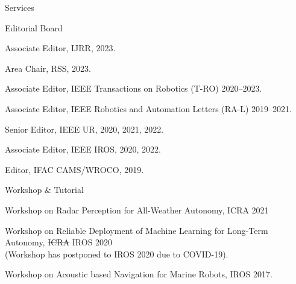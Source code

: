 \begin{rSection}{Services}
\begin{rSubsection}{Editorial Board}{}{}{}
  \item Associate Editor, IJRR, 2023.
  \item Area Chair, RSS, 2023.
  \item Associate Editor, IEEE Transactions on Robotics (T-RO) 2020--2023.
  \item Associate Editor, IEEE Robotics and Automation Letters (RA-L) 2019--2021.
  \item Senior Editor, IEEE UR, 2020, 2021, 2022.
  \item Associate Editor, IEEE IROS, 2020, 2022.
  \item Editor, IFAC CAMS/WROCO, 2019.
\end{rSubsection}

\begin{rSubsection}{Workshop \& Tutorial}{}{}{}
  \item Workshop on Radar Perception for All-Weather Autonomy, ICRA 2021
  \item Workshop on Reliable Deployment of Machine Learning for Long-Term Autonomy, \sout{ICRA} IROS 2020\\
  (Workshop has postponed to IROS 2020 due to COVID-19).
  \item Workshop on Acoustic based Navigation for Marine Robots, IROS 2017.
\end{rSubsection}


\end{rSection}
